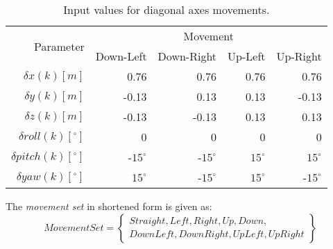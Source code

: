 \begin{table}[H]
    \centering
    \begin{tabular}{r||r|r|r|r}
    	\multirow{2}{*}{Parameter} & \multicolumn{4}{c}{Movement} \\\cline{2-5} 
                    & Down-Left & Down-Right & Up-Left  & Up-Right   \\\hline\hline
        $\delta     x(k)[m]$           & 0.76  & 0.76  & 0.76 & 0.76  \\\hline
        $\delta     y(k)[m]$           & -0.13	& 0.13	& 0.13 & -0.13 \\\hline
        $\delta     z(k)[m]$           & -0.13 & -0.13 & 0.13 & 0.13  \\\hline
        $\delta  roll(k) [^\circ]$	& 0	    & 0	    & 0    & 0     \\\hline
        $\delta pitch(k) [^\circ]$     & -$15^\circ$ & -$15^\circ$ & $15^\circ$ & $15^\circ$     \\\hline
        $\delta   yaw(k) [^\circ]$    & $15^\circ$	& -$15^\circ$	& $15^\circ$ & -$15^\circ$ \\
    \end{tabular}
    \caption{Input values for diagonal axes movements.}
    \label{tab:movements2}
\end{table}

\begin{note}
    The \emph{movement set} in shortened form is given as:
    \begin{equation}\label{eq:OurMovementSet}
        Movement Set= \left\{
        \begin{gathered}
            Straight, Left,Right, Up, Down,\\
            Down Left, Down Right,  Up Left,   Up Right
        \end{gathered}
        \right\}
    \end{equation}
\end{note}

